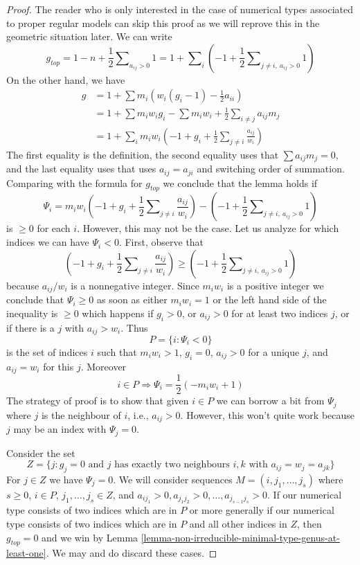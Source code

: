 \documentclass{stacks-project}
\theoremstyle{plain}
\theoremstyle{definition}
\theoremstyle{remark}
\numberwithin{equation}{subsection}
\begin{document}
\begin{proof}
The reader who is only interested in the case of numerical types
associated to proper regular models can skip this proof as we will
reprove this in the geometric situation later.
We can write
$$
g_{top} = 1 - n + \frac{1}{2}\sum\nolimits_{a_{ij} > 0} 1 =
1 + \sum\nolimits_i (-1 +
\frac{1}{2}\sum\nolimits_{j \not = i,\ a_{ij} > 0} 1) 
$$
On the other hand, we have
\begin{align*}
g & =
1 + \sum m_i(w_i(g_i - 1) - \frac{1}{2} a_{ii}) \\
& =
1 + \sum m_iw_ig_i - \sum m_iw_i +
\frac{1}{2} \sum\nolimits_{i \not = j} a_{ij}m_j \\
& =
1 + \sum\nolimits_i
m_iw_i(-1 + g_i + \frac{1}{2} \sum\nolimits_{j \not = i} \frac{a_{ij}}{w_i})
\end{align*}
The first equality is the definition, the second equality uses that
$\sum a_{ij}m_j = 0$, and the last equality uses that
uses $a_{ij} = a_{ji}$ and switching order of
summation. Comparing with the formula for $g_{top}$ we conclude
that the lemma holds if
$$
\Psi_i =
m_iw_i(-1 + g_i + \frac{1}{2} \sum\nolimits_{j \not = i} \frac{a_{ij}}{w_i})
- (-1 + \frac{1}{2}\sum\nolimits_{j \not = i,\ a_{ij} > 0} 1)
$$
is $\geq 0$ for each $i$. However, this may not be the case.
Let us analyze for which indices we can have $\Psi_i < 0$.
First, observe that
$$
(-1 + g_i + \frac{1}{2}\sum\nolimits_{j \not = i} \frac{a_{ij}}{w_i}) \geq
(-1 + \frac{1}{2}\sum\nolimits_{j \not = i,\ a_{ij} > 0} 1)
$$
because $a_{ij}/w_i$ is a nonnegative integer. Since $m_iw_i$ is
a positive integer we conclude that $\Psi_i \geq 0$ as soon as
either $m_iw_i = 1$ or the left hand side of the inequality is $\geq 0$
which happens if $g_i > 0$, or $a_{ij} > 0$ for at least two indices $j$, or
if there is a $j$ with $a_{ij} > w_i$. Thus
$$
P = \{i : \Psi_i < 0\}
$$
is the set of indices $i$ such that $m_iw_i > 1$, $g_i = 0$,
$a_{ij} > 0$ for a unique $j$, and $a_{ij} = w_i$ for this $j$.
Moreover
$$
i \in P \Rightarrow \Psi_i = \frac{1}{2}(-m_iw_i + 1)
$$
The strategy of proof is to show that given $i \in P$ we can borrow a bit
from $\Psi_j$ where $j$ is the neighbour of $i$, i.e., $a_{ij} > 0$.
However, this won't quite work because $j$ may be an index with $\Psi_j = 0$.

\medskip\noindent
Consider the set
$$
Z = \{j : g_j = 0\text{ and }
j\text{ has exactly two neighbours }i, k\text{ with }
a_{ij} = w_j = a_{jk}\}
$$
For $j \in Z$ we have $\Psi_j = 0$. We will consider sequences
$M = (i, j_1, \ldots, j_s)$ where $s \geq 0$,
$i \in P$, $j_1, \ldots, j_s \in Z$, and
$a_{ij_1} > 0, a_{j_1j_2} > 0, \ldots, a_{j_{s - 1}j_s} > 0$.
If our numerical type consists of two indices which are in $P$
or more generally if our numerical type consists of
two indices which are in $P$ and all other indices in $Z$, then
$g_{top} = 0$ and we win by
Lemma \ref{lemma-non-irreducible-minimal-type-genus-at-least-one}.
We may and do discard these cases.


\end{proof}
\end{document}
